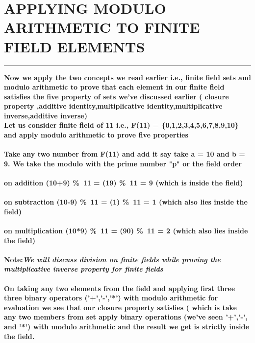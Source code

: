 \documentclass{article}
\begin{document}
\section * {APPLYING MODULO ARITHMETIC TO FINITE FIELD ELEMENTS}
\hrule
\bigskip 
\textbf{Now we apply the two concepts we read earlier i.e., finite field sets and modulo arithmetic to prove that each element in our finite field satisfies the five property of sets we've discussed earlier ( closure property ,additive identity,multiplicative identity,multiplicative inverse,additive inverse)
\\
Let us consider finite field of 11 i.e., F(11) = \{0,1,2,3,4,5,6,7,8,9,10\} and apply modulo arithmetic to prove five properties 
\\ 
\\
Take any two number from F(11) and add it say take a = 10 and b = 9. We take the modulo with the prime number "p" or the field order 
\\
\\
on addition (10+9) \%\ 11 = (19) \%\ 11 = 9 (which is inside the field)
\\
\\
on subtraction (10-9) \%\ 11 = (1) \%\ 11 = 1  (which also lies inside the field)
\\
\\
on multiplication (10*9) \%\ 11 = (90) \%\ 11 = 2 (which also lies inside the field)
\\
\\
\textbf{Note:}\textit{We will discuss division on finite fields  while proving the multiplicative inverse property for finite fields} 
\\
\\
On taking any two elements from the field and applying first three three binary operators ('+','-','*') with modulo arithmetic for evaluation we see that our closure property satisfies ( which is take any two members from set apply binary operations (we've seen '+','-', and '*') with modulo arithmetic  and the result we get is strictly inside the field.}

\pagebreak 
\end{document}
